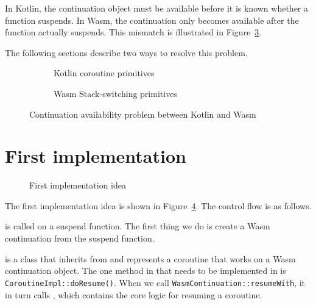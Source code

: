 In Kotlin, the continuation object must be available before it is known whether a function suspends.
In Wasm, the continuation only becomes available after the function actually suspends.
This mismatch is illustrated in Figure~\ref{fig:primitives-correspondence-r}.

The following sections describe two ways to resolve this problem.

\begin{figure}[H]
    \centering
    \begin{subfigure}{0.48\textwidth}
        \centering
        \resizebox{\textwidth}{!}{}
        \caption{Kotlin coroutine primitives}
        \label{subfig:kotlin-primitives-r}
    \end{subfigure}
    \hfill
    \begin{subfigure}{0.48\textwidth}
        \centering
        \resizebox{\textwidth}{!}{}
        \caption{Wasm Stack-switching primitives}
        \label{subfig:wasm-primitives-r}
    \end{subfigure}
    \caption{Continuation availability problem between Kotlin and Wasm}
    \label{fig:primitives-correspondence-r}
\end{figure}

\section{First implementation}
\label{sec:base-implementation}

\begin{figure}[H]
    \centering
    \resizebox{\textwidth}{!}{}
    \caption{First implementation idea}
    \label{fig:base-implementation}
\end{figure}

The first implementation idea is shown in Figure~\ref{fig:base-implementation}. The control flow is as follows.

\startCoroutineUninterceptedOrReturn is called on a suspend function. The first thing we do is create a Wasm
continuation from the suspend function.

\WasmContinuation is a class that inherits from \CoroutineImpl and represents a coroutine that
works on a Wasm continuation object. The one method in \CoroutineImpl that needs to
be implemented in \WasmContinuation is \texttt{CoroutineImpl::doResume()}. When we call
\texttt{WasmContinuation::resumeWith}, it in turn calls \doResume, which contains the core logic for resuming
a coroutine.

